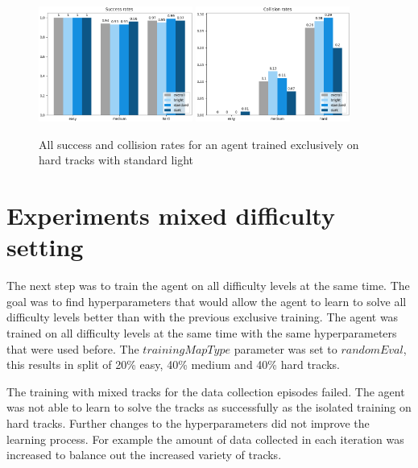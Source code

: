 \begin{figure}
    \centering
    \includegraphics[width=0.45\textwidth]{Bilder/notebook_images/hardDistanceStandardLight_eval_all_success_rates_barplot.png}
    \includegraphics[width=0.45\textwidth]{Bilder/notebook_images/hardDistanceStandardLight_eval_all_collision_rates_barplot.png}
    \caption{All success and collision rates for an agent trained exclusively on hard tracks with standard light}
    \label{fig:hardDistance_generalization_light_settings}
\end{figure}

\section{Experiments mixed difficulty setting}
\label{cha:experiment_mixed_difficulty}

The next step was to train the agent on all difficulty levels at the same time. The goal was to find hyperparameters that would allow the agent to learn to solve all difficulty levels better than with the previous exclusive training. The agent was trained on all difficulty levels at the same time with the same hyperparameters that were used before. The $trainingMapType$ parameter was set to $randomEval$, this results in split of 20\% easy, 40\% medium and 40\% hard tracks.

The training with mixed tracks for the data collection episodes failed. The agent was not able to learn to solve the tracks as successfully as the isolated training on hard tracks. Further changes to the hyperparameters did not improve the learning process. For example the amount of data collected in each iteration was increased to balance out the increased variety of tracks.

